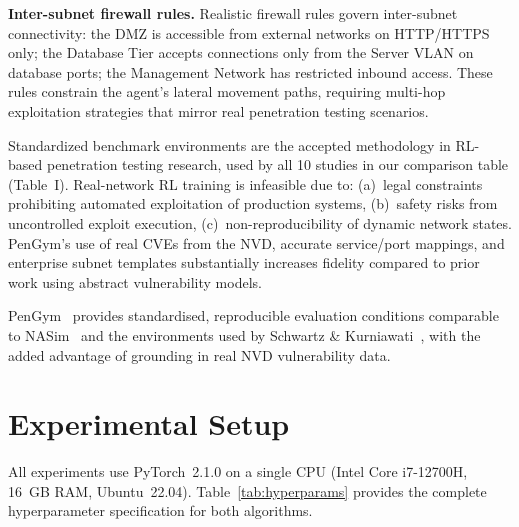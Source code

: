 \documentclass[conference]{IEEEtran}
\begin{document}
\textbf{Inter-subnet firewall rules.}  Realistic firewall rules
govern inter-subnet connectivity: the DMZ is accessible from external
networks on HTTP/HTTPS only; the Database Tier accepts connections
only from the Server VLAN on database ports; the Management Network
has restricted inbound access.  These rules constrain the agent's
lateral movement paths, requiring multi-hop exploitation strategies
that mirror real penetration testing scenarios.

Standardized benchmark environments are the accepted methodology in RL-based
penetration testing research, used by all 10 studies in our comparison
table (Table~I).  Real-network RL training is infeasible due to:
(a)~legal constraints prohibiting automated exploitation of production
systems, (b)~safety risks from uncontrolled exploit execution,
(c)~non-reproducibility of dynamic network states.  PenGym's use of real
CVEs from the NVD, accurate service/port mappings, and enterprise subnet templates
substantially increases fidelity compared to prior work
using abstract vulnerability models.

PenGym~\cite{nguyen2025cose} provides standardised, reproducible evaluation
conditions comparable to NASim~\cite{nasim} and the environments used by
Schwartz \& Kurniawati~\cite{schwartz2019autonomous}, with the added
advantage of grounding in real NVD vulnerability data.

\section{Experimental Setup}
\label{sec:experiments}

All experiments use PyTorch~2.1.0 on a single CPU (Intel Core
i7-12700H, 16~GB RAM, Ubuntu~22.04).  Table~\ref{tab:hyperparams}
provides the complete hyperparameter specification for both algorithms.
\end{document}
